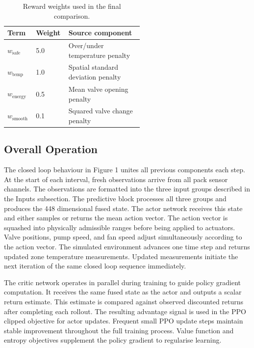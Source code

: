\documentclass[twocolumn]{article}
\begin{document}
\begin{table}[!tb]
\centering
\caption{Reward weights used in the final comparison.}\label{tab:reward_weights}
\small
\renewcommand{\arraystretch}{1.1}
\begin{tabular}{llp{0.55\linewidth}}
\hline
Term & Weight & Source component\\
\hline
$w_{\mathrm{safe}}$ & 5.0 & Over/under temperature penalty\\
$w_{\mathrm{temp}}$ & 1.0 & Spatial standard deviation penalty\\
$w_{\mathrm{energy}}$ & 0.5 & Mean valve opening penalty\\
$w_{\mathrm{smooth}}$ & 0.1 & Squared valve change penalty\\
\hline
\end{tabular}
\end{table}

\subsection*{Overall Operation}

The closed loop behaviour in Figure 1 unites all previous components each step. At the start of each interval, fresh observations arrive from all pack sensor channels. The observations are formatted into the three input groups described in the Inputs subsection. The predictive block processes all three groups and produces the 448 dimensional fused state. The actor network receives this state and either samples or returns the mean action vector. The action vector is squashed into physically admissible ranges before being applied to actuators. Valve positions, pump speed, and fan speed adjust simultaneously according to the action vector. The simulated environment advances one time step and returns updated zone temperature measurements. Updated measurements initiate the next iteration of the same closed loop sequence immediately.

The critic network operates in parallel during training to guide policy gradient computation. It receives the same fused state as the actor and outputs a scalar return estimate. This estimate is compared against observed discounted returns after completing each rollout. The resulting advantage signal is used in the PPO clipped objective for actor updates. Frequent small PPO update steps maintain stable improvement throughout the full training process. Value function and entropy objectives supplement the policy gradient to regularise learning.
\end{document}
